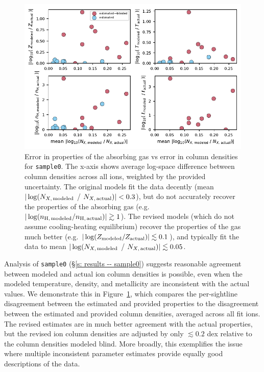 \documentclass[fleqn,usenatbib]{mnras}
\begin{document}
\begin{figure}
    \centering
    \includegraphics[width=\textwidth]{figures/sample0/error_vs_error.pdf}
    \caption{
    Error in properties of the absorbing gas vs error in column densities for \texttt{sample0}.
    The x-axis shows average log-space difference between column densities across all ions, weighted by the provided uncertainty.
    The original models fit the data decently (mean $\vert \log( N_{X,\,{\rm modeled}}$ / $N_{X,\,{\rm actual}}) \vert < 0.3$), but do not accurately recover the properties of the absorbing gas (e.g. $\vert \log( n_{\rm H,\,modeled} / n_{\rm H,\,actual}) \vert \gtrsim 1$).
    The revised models (which do not assume cooling-heating equilibrium) recover the properties of the gas much better (e.g. $\vert \log( Z_{\rm modeled} / Z_{\rm actual}) \vert \lesssim 0.1$), and typically fit the data to mean $\vert \log( N_{X,\,{\rm modeled}}$ / $N_{X,\,{\rm actual}}) \vert \lesssim 0.05$.
    }
    \label{f: error vs error}
\end{figure}

Analysis of \texttt{sample0} (\S\ref{s: results -- sample0}) suggests reasonable agreement between modeled and actual ion column densities is possible, even when the modeled temperature, density, and metallicity are inconsistent with the actual values.
We demonstrate this in Figure~\ref{f: error vs error},
which compares the per-sightline disagreement between the estimated and provided properties to the disagreement between the estimated and provided column densities, averaged across all fit ions. 
The revised estimates are in much better agreement with the actual properties, but the revised ion column densities are adjusted by only $\lesssim 0.2$ dex relative to the column densities modeled blind.
More broadly, this exemplifies the issue where multiple inconsistent parameter estimates provide equally good descriptions of the data.
\end{document}
